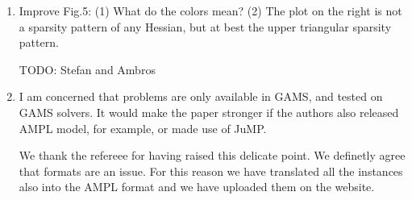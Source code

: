 \documentclass[11pt]{article}
\newcommand{\rep}[1]{{\textcolor{acblue}{#1}}}
\newcommand{\leo}[1]{{\color{red}#1}}
\newcommand{\fabio}[1]{{\color{cyan}#1}}
\begin{document}
{\begin{enumerate}
\rep{
TODO: Stefan and Ambros.
 }


\item Improve Fig.5: (1) What do the colors mean? (2) The plot on the right is not a sparsity pattern
of any Hessian, but at best the upper triangular sparsity pattern.

\rep{TODO: Stefan and Ambros}


\item I am concerned that problems are only available in GAMS, and tested on GAMS solvers. It would make the paper stronger if the authors also released AMPL model, for example, or made use of
JuMP.

\rep{
We thank the refereee for having raised this delicate point. We definetly agree that formats are an issue.
For this reason we have translated all the instances also into the AMPL format and we have uploaded them on the website.
}

\end{enumerate}

}
\end{document}
